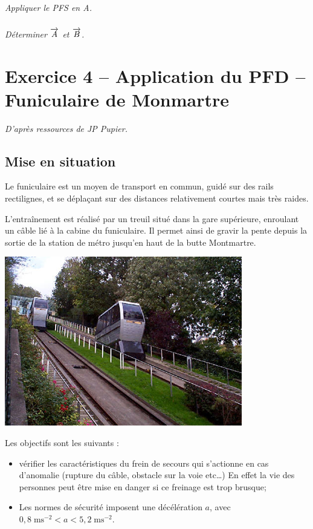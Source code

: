\documentclass[10pt,fleqn]{book} %
\begin{document}
\begin{multicols}{2}
\subparagraph{}
\textit{Appliquer le PFS en A.}

\subparagraph{}
\textit{Déterminer $\overrightarrow{A}$ et $\overrightarrow{B}$.}


\section*{Exercice 4 -- Application du PFD -- Funiculaire de Monmartre}
\setcounter{subparagraph}{0}
\textit{D'après ressources de JP Pupier.}

\subsection*{Mise en situation}
Le funiculaire est un moyen de transport en commun, guidé sur des rails rectilignes, et se déplaçant sur des distances relativement courtes mais très raides. 

L’entraînement est réalisé par un treuil situé dans la gare supérieure, enroulant un câble lié à la cabine du funiculaire. Il permet ainsi de gravir la pente depuis la sortie de la station de métro jusqu’en haut de la butte Montmartre.
\begin{center}
\includegraphics[width=\linewidth]{images/fig_06}
\end{center}

Les objectifs sont les suivants :
\begin{itemize}
\item vérifier les caractéristiques du frein de secours qui s’actionne en cas d’anomalie (rupture du câble, obstacle sur la voie etc…) En effet la vie des personnes peut être mise en danger si ce freinage est trop brusque;
\item Les normes de sécurité imposent une décélération $a$, avec $0,8\;\text{ms}^{-2}<a<5,2\;\text{ms}^{-2}$.
\end{itemize}


\end{multicols}
\end{document}
